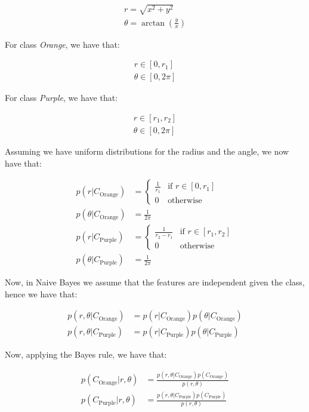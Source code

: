 \documentclass[12pt,a4paper,oneside]{paper}
\begin{document}
\begin{align*}
    r = \sqrt{x^2 + y^2} \\
    \theta = \arctan\left(\frac{y}{x}\right)
\end{align*}

For class \textit{Orange}, we have that:

\begin{align*}
    r \in [0, r_1] \\
    \theta \in [0, 2\pi]
\end{align*}

For class \textit{Purple}, we have that:

\begin{align*}
    r \in [r_1, r_2] \\
    \theta \in [0, 2\pi]
\end{align*}

Assuming we have uniform distributions for the radius and the angle, we now have that: 

\begin{align*}
    p(r | C_{\text{Orange}}) &= \begin{cases}
        \frac{1}{r_1} & \text{if } r \in [0, r_1] \\
        0 & \text{otherwise}
    \end{cases} \\
    p(\theta | C_{\text{Orange}}) &= \frac{1}{2\pi} \\
    p(r | C_{\text{Purple}}) &= \begin{cases}
        \frac{1}{r_2 - r_1} & \text{if } r \in [r_1, r_2] \\
        0 & \text{otherwise}
    \end{cases} \\
    p(\theta | C_{\text{Purple}}) &= \frac{1}{2\pi}
\end{align*}

Now, in Naive Bayes we assume that the features are independent given the class, hence we have that:

\begin{align*}
    p(r, \theta | C_{\text{Orange}}) &= p(r | C_{\text{Orange}}) p(\theta | C_{\text{Orange}}) \\
    p(r, \theta | C_{\text{Purple}}) &= p(r | C_{\text{Purple}}) p(\theta | C_{\text{Purple}})
\end{align*}

Now, applying the Bayes rule, we have that:

\begin{align*}
    p(C_{\text{Orange}} | r, \theta) &= \frac{p(r, \theta | C_{\text{Orange}}) p(C_{\text{Orange}})}{p(r, \theta)} \\
    p(C_{\text{Purple}} | r, \theta) &= \frac{p(r, \theta | C_{\text{Purple}}) p(C_{\text{Purple}})}{p(r, \theta)}
\end{align*}
\end{document}
